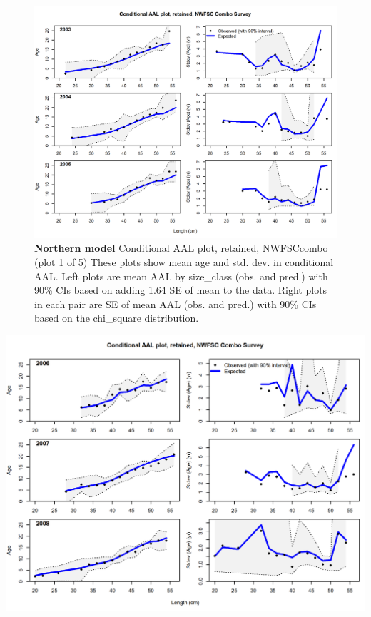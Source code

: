 \documentclass[12pt,]{article}
\begin{document}
\begin{figure}[htbp]
\centering
\includegraphics{./r4ss/plots_mod1/comp_condAALfit_Andre_plotsflt6mkt2_page1.png}
\caption{\textbf{Northern model} Conditional AAL plot, retained,
NWFSCcombo (plot 1 of 5) These plots show mean age and std. dev. in
conditional AAL. Left plots are mean AAL by size\_class (obs. and pred.)
with 90\% CIs based on adding 1.64 SE of mean to the data. Right plots
in each pair are SE of mean AAL (obs. and pred.) with 90\% CIs based on
the chi\_square distribution.
\label{fig:mod1_4_comp_condAALfit_Andre_plotsflt6mkt2_page1}}
\end{figure}

\includegraphics{./r4ss/plots_mod1/comp_condAALfit_Andre_plotsflt6mkt2_page2.png}
\end{document}
